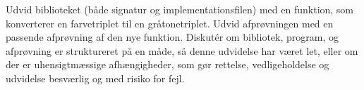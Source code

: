 Udvid biblioteket (både signatur og implementationsfilen) med en funktion, som konverterer en farvetriplet til en gråtonetriplet. Udvid afprøvningen med en passende afprøvning af den nye funktion. Diskut\'{e}r om bibliotek, program, og afprøvning er struktureret på en måde, så denne udvidelse har været let, eller om der er uhensigtmæssige afhængigheder, som gør rettelse, vedligeholdelse og udvidelse besværlig og med risiko for fejl.
